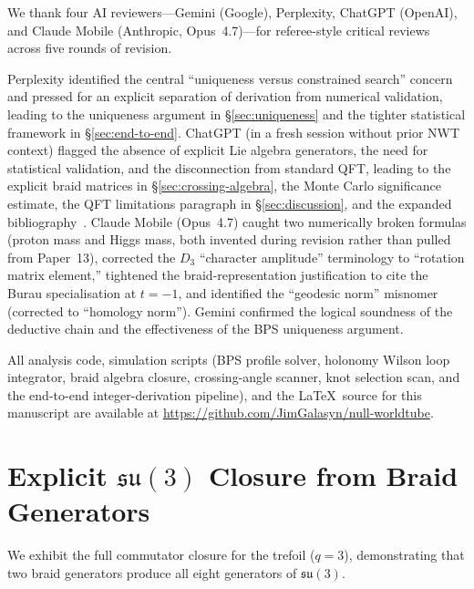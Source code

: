 \documentclass[11pt]{article}
\newcommand{\su}{\mathfrak{su}}
\begin{document}
We thank four AI reviewers---Gemini (Google), Perplexity, ChatGPT
(OpenAI), and Claude Mobile (Anthropic, Opus~4.7)---for
referee-style critical reviews across five rounds of revision.

Perplexity identified the central ``uniqueness versus constrained
search'' concern and pressed for an explicit separation of
derivation from numerical validation, leading to the uniqueness
argument in \S\ref{sec:uniqueness} and the tighter statistical
framework in \S\ref{sec:end-to-end}.  ChatGPT (in a fresh
session without prior NWT context) flagged the absence of explicit
Lie algebra generators, the need for statistical validation, and
the disconnection from standard QFT, leading to the explicit
braid matrices in \S\ref{sec:crossing-algebra}, the Monte Carlo
significance estimate, the QFT limitations paragraph in
\S\ref{sec:discussion}, and the expanded
bibliography~\cite{Jones1985,Witten1989,Kauffman1991,Birman1974,FultonHarris}.
Claude Mobile (Opus~4.7) caught two numerically broken formulas
(proton mass and Higgs mass, both invented during revision rather
than pulled from Paper~13), corrected the $D_3$ ``character
amplitude'' terminology to ``rotation matrix element,'' tightened
the braid-representation justification to cite the Burau
specialisation at $t = -1$, and identified the ``geodesic norm''
misnomer (corrected to ``homology norm'').  Gemini confirmed the
logical soundness of the deductive chain and the effectiveness of
the BPS uniqueness argument.

All analysis code, simulation scripts (BPS profile solver,
holonomy Wilson loop integrator, braid algebra closure,
crossing-angle scanner, knot selection scan, and the end-to-end
integer-derivation pipeline), and the \LaTeX\ source for this
manuscript are available at
\url{https://github.com/JimGalasyn/null-worldtube}.


\appendix
\section{Explicit $\su(3)$ Closure from Braid Generators}
\label{app:su3}

We exhibit the full commutator closure for the trefoil ($q = 3$),
demonstrating that two braid generators produce all eight
generators of $\su(3)$.
\end{document}
